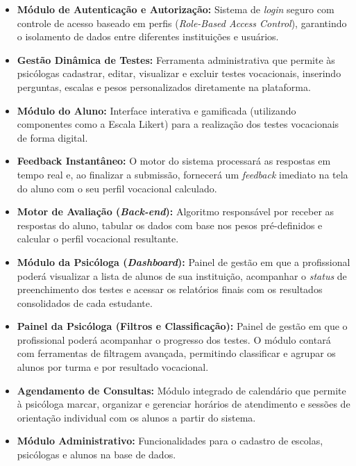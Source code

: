 \begin{itemize}
    \item \textbf{Módulo de Autenticação e Autorização:} Sistema de \textit{login} seguro com controle de acesso baseado em perfis (\textit{Role-Based Access Control}), garantindo o isolamento de dados entre diferentes instituições e usuários.

    \item \textbf{Gestão Dinâmica de Testes:} Ferramenta administrativa que permite às psicólogas cadastrar, editar, visualizar e excluir testes vocacionais, inserindo perguntas, escalas e pesos personalizados diretamente na plataforma.

    \item \textbf{Módulo do Aluno:} Interface interativa e gamificada (utilizando componentes como a Escala Likert) para a realização dos testes vocacionais de forma digital.

    \item \textbf{Feedback Instantâneo:} O motor do sistema processará as respostas em tempo real e, ao finalizar a submissão, fornecerá um \textit{feedback} imediato na tela do aluno com o seu perfil vocacional calculado.

    \item \textbf{Motor de Avaliação (\textit{Back-end}):} Algoritmo responsável por receber as respostas do aluno, tabular os dados com base nos pesos pré-definidos e calcular o perfil vocacional resultante.

    \item \textbf{Módulo da Psicóloga (\textit{Dashboard}):} Painel de gestão em que a profissional poderá visualizar a lista de alunos de sua instituição, acompanhar o \textit{status} de preenchimento dos testes e acessar os relatórios finais com os resultados consolidados de cada estudante.

    \item \textbf{Painel da Psicóloga (Filtros e Classificação):} Painel de gestão em que o profissional poderá acompanhar o progresso dos testes. O módulo contará com ferramentas de filtragem avançada, permitindo classificar e agrupar os alunos por turma e por resultado vocacional.

    \item \textbf{Agendamento de Consultas:} Módulo integrado de calendário que permite à psicóloga marcar, organizar e gerenciar horários de atendimento e sessões de orientação individual com os alunos a partir do sistema.

    \item \textbf{Módulo Administrativo:} Funcionalidades para o cadastro de escolas, psicólogas e alunos na base de dados.
\end{itemize}

